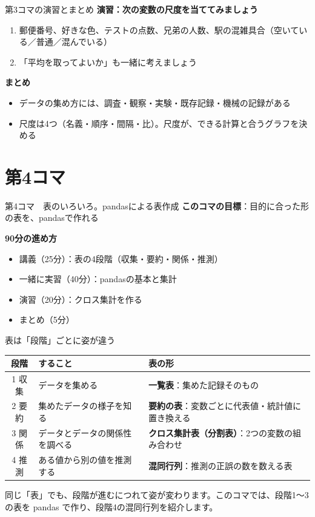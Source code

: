 \documentclass[aspectratio=169,11pt]{beamer}
\newcommand{\sess}[3]{%
\begin{frame}{#1}
\textbf{このコマの目標}：#2

\vspace{0.6em}
\textbf{90分の進め方}
\begin{itemize}
#3
\end{itemize}
\end{frame}}
\begin{document}
\begin{frame}{第3コマの演習とまとめ}
\textbf{演習：次の変数の尺度を当ててみましょう}
\begin{enumerate}
\item 郵便番号、好きな色、テストの点数、兄弟の人数、駅の混雑具合（空いている／普通／混んでいる）
\item 「平均を取ってよいか」も一緒に考えましょう
\end{enumerate}
\vspace{0.5em}
\textbf{まとめ}
\begin{itemize}
\item データの集め方には、調査・観察・実験・既存記録・機械の記録がある
\item 尺度は4つ（名義・順序・間隔・比）。尺度が、できる計算と合うグラフを決める
\end{itemize}
\end{frame}

\section{第4コマ}
\sess{第4コマ　表のいろいろ。pandasによる表作成}{目的に合った形の表を、pandasで作れる}
{\item 講義（25分）：表の4段階（収集・要約・関係・推測）
\item 一緒に実習（40分）：pandasの基本と集計
\item 演習（20分）：クロス集計を作る
\item まとめ（5分）}

\begin{frame}{表は「段階」ごとに姿が違う}
\begin{center}
\begin{tabular}{clp{7.6cm}}
\toprule
段階 & すること & 表の形 \\
\midrule
1 収集 & データを集める & \textbf{一覧表}：集めた記録そのもの \\
2 要約 & 集めたデータの様子を知る & \textbf{要約の表}：変数ごとに代表値・統計値に置き換える \\
3 関係 & データとデータの関係性を調べる & \textbf{クロス集計表（分割表）}：2つの変数の組み合わせ \\
4 推測 & ある値から別の値を推測する & \textbf{混同行列}：推測の正誤の数を数える表 \\
\bottomrule
\end{tabular}
\end{center}
同じ「表」でも、段階が進むにつれて姿が変わります。このコマでは、段階1〜3の表を pandas で作り、段階4の混同行列を紹介します。
\end{frame}
\end{document}
